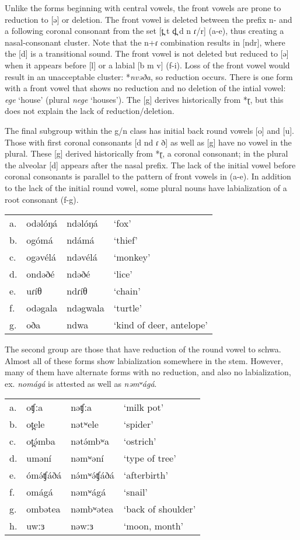 Unlike the forms beginning with central vowels, the front vowels are prone to reduction to [ə] or deletion. The front vowel is deleted between the prefix n- and a following coronal consonant from the set [t̪ t d̪ d n ɾ/r] (a-e), thus creating a nasal-consonant cluster. Note that the n+ɾ combination results in [ndr], where the [d] is a transitional sound. The front vowel is not deleted but reduced to [ə] when it appears before [l] or a labial [b m v] (f-i). Loss of the front vowel would result in an unacceptable cluster: *\textit{nvəða}, so reduction occurs. There is one form with a front vowel that shows no reduction and no deletion of the intial vowel: \textit{ege} ‘house’ (plural \textit{nege} ‘houses’). The [g] derives historically from *ɽ, but this does not explain the lack of reduction/deletion. 
	
The final subgroup within the g/n class has initial back round vowels [o] and [u]. Those with first coronal consonants [d nd ɾ ð] as well as [g] have no vowel in the plural. These [g] derived historically from *ɽ, a coronal consonant; in the plural the alveolar [d] appears after the nasal prefix. The lack of the initial vowel before coronal consonants is parallel to the pattern of front vowels in (a-e). In addition to the lack of the initial round vowel, some plural nouns have labialization of a root consonant (f-g).

\ea
\begin{tabular}[t]{llll}
a.	&	odəlóŋá	&	ndəlóŋá		&	‘fox’\\
b.	&	ogómá	&	ndámá		&	‘thief’\\
c.	&	ogəvélá	&	ndəvélá		&	‘monkey’\\
d.	&	ondəðé	&	ndəðé		&	‘lice’\\
e.	&	uɾíθ	&	ndɾíθ		&	‘chain’\\
f.	&	odəgala	&	ndəgwala		&	‘turtle’\\
g.	&	oða		&	ndwa			&	‘kind of deer, antelope’	\\
\end{tabular}
\z

The second group are those that have reduction of the round vowel to schwa. Almost all of these forms show labialization somewhere in the stem. However, many of them have alternate forms with no reduction, and also no labialization, ex. \textit{nomágá} is attested as well as \textit{nəmʷágá}. 

\ea	
\begin{tabular}[t]{llll}
a.	&	oʧːa	&	nəʧːa	&	‘milk pot’\\
b.	&	ot̪ele	&	nətʷele	&	‘spider’\\
c.	&	ot̪ə́mba	&	nətə́mbʷa	&	‘ostrich’\\
d.	&	uməní	&	nəmʷəní	&	‘type of tree’\\
e.	&	ómə́ʧáðá	&	nə́mʷə́ʧáðá	&	‘afterbirth’\\
f.	&	omágá	&	nəmʷágá	&	‘snail’\\
g.	&	ombətea	&	nəmbʷətea&	‘back of shoulder’\\
h.	&	uwːɜ	&	nəwːɜ	&	‘moon, month’\\
\end{tabular}
\z

